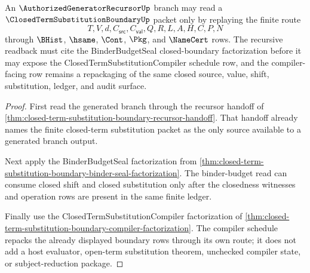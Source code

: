 \begin{theorem}
\label{thm:closed-term-substitution-boundary-recursive-readback}
An $\AuthorizedGeneratorRecursorUp$ branch may read a $\ClosedTermSubstitutionBoundaryUp$ packet only by replaying the finite route
$$
T,V,d,C_{\mathsf{src}},C_{\mathsf{val}},Q,R,L,A,H,C,P,N
$$
through $\BHist$, $\hsame$, $\Cont$, $\Pkg$, and $\NameCert$ rows. The recursive readback must cite the BinderBudgetSeal closed-boundary factorization before it may expose the ClosedTermSubstitutionCompiler schedule row, and the compiler-facing row remains a repackaging of the same closed source, value, shift, substitution, ledger, and audit surface.
\end{theorem}
\begin{proof}
First read the generated branch through the recursor handoff of \autoref{thm:closed-term-substitution-boundary-recursor-handoff}. That handoff already names the finite closed-term substitution packet as the only source available to a generated branch output.

Next apply the BinderBudgetSeal factorization from \autoref{thm:closed-term-substitution-boundary-binder-seal-factorization}. The binder-budget read can consume closed shift and closed substitution only after the closedness witnesses and operation rows are present in the same finite ledger.

Finally use the ClosedTermSubstitutionCompiler factorization of \autoref{thm:closed-term-substitution-boundary-compiler-factorization}. The compiler schedule repacks the already displayed boundary rows through its own route; it does not add a host evaluator, open-term substitution theorem, unchecked compiler state, or subject-reduction package.
\end{proof}

